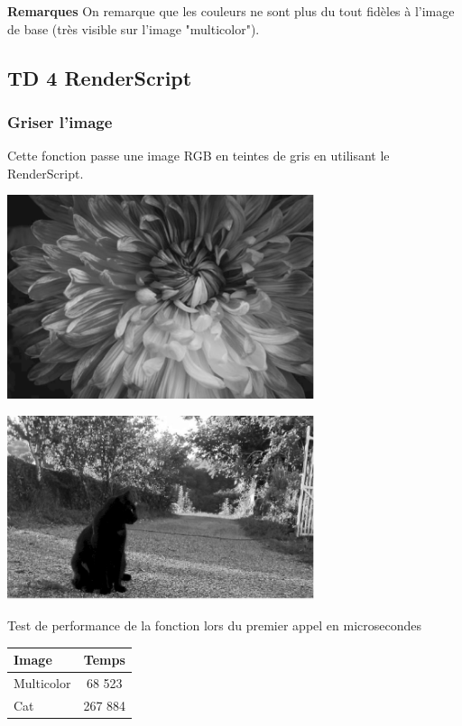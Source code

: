 \documentclass{article}
\begin{document}
\textbf{Remarques}
On remarque que les couleurs ne sont plus du tout fidèles à l'image de base (très visible sur l'image "multicolor").

\newpage
\subsection{TD 4 RenderScript}

\subsubsection{Griser l'image}

Cette fonction passe une image RGB en teintes de gris en utilisant le RenderScript.

\begin{center} 
    \includegraphics[width=9cm]{../Image_fonctions/Multicolor/GrayRS.PNG}
\end{center}
\begin{center} 
    \includegraphics[width=9cm]{../Image_fonctions/Cat/GrayRS.PNG}
\end{center}

\begin{center}
\medbreak
Test de performance de la fonction lors du premier appel en microsecondes
\bigbreak
   \begin{tabular}{ | l | c | }
     \hline
     Image & Temps \\
     \hline
     Multicolor & 68 523 \\
     \hline
     Cat & 267 884 \\
     \hline
   \end{tabular}
 \end{center}
\bigbreak
\end{document}
